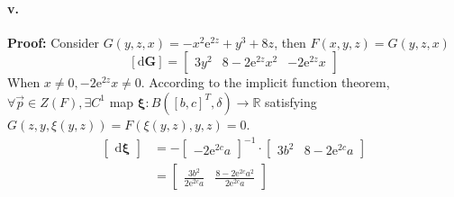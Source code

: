 \documentclass[11pt, a4paper]{article}
\begin{document}
\paragraph{v.}
\textbf{Proof:}
Consider $G(y, z, x) = -x^2\mathrm{e}^{2z} + y^3 + 8z$, then $F(x, y, z) = G(y, z, x)$
$$[\mathrm{d}\bm{G}] = 
\begin{bmatrix}
    3y^2 & 8 - 2\mathrm{e}^{2z}x^2 & -2\mathrm{e}^{2z}x
\end{bmatrix}$$
When $x \neq 0, -2\mathrm{e}^{2z}x \neq 0$. According to the implicit function theorem, $\forall \vec{p} \in Z(F), \exists C^1$ map $\bm{\xi}: B([b, c]^T, \delta) \to \mathbb{R}$ satisfying $G(z, y, \xi(y, z)) = F(\xi(y, z), y, z) = 0$.
$$\begin{aligned}
    \begin{bmatrix}
        \mathrm{d}\bm{\xi}
    \end{bmatrix} &= -
    \begin{bmatrix}
        -2\mathrm{e}^{2c}a
    \end{bmatrix}^{-1} \cdot 
    \begin{bmatrix}
        3b^2 & 8 - 2\mathrm{e}^{2c}a
    \end{bmatrix} \\
    &=
    \begin{bmatrix}
        \frac{3b^2}{2\mathrm{e}^{2c}a} & \frac{8 - 2\mathrm{e}^{2c}a^2}{2\mathrm{e}^{2c}a}
    \end{bmatrix}
\end{aligned}$$
\end{document}
